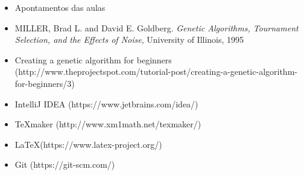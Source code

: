 \documentclass[11pt,a4paper,reqno]{article}
\numberwithin{equation}{section}
\begin{document}
\begin{itemize}
\item Apontamentos das aulas
\item MILLER, Brad L. and David E. Goldberg. \textit{Genetic Algorithms, Tournament Selection, and the Effects of Noise}, University of Illinois, 1995
\item Creating a genetic algorithm for beginners (http://www.theprojectspot.com/tutorial-post/creating-a-genetic-algorithm-for-beginners/3)
\item IntelliJ IDEA (https://www.jetbrains.com/idea/)
\item TeXmaker (http://www.xm1math.net/texmaker/)
\item LaTeX(https://www.latex-project.org/)
\item Git (https://git-scm.com/)

\end{itemize}
\end{document}
